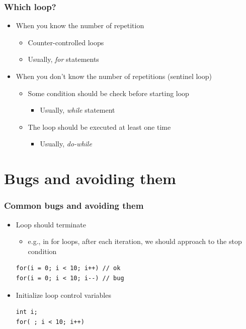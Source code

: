 \documentclass{../c-lecture}
\begin{document}
\begin{frame}
  \frametitle{Which loop?}
  \begin{itemize}
    \item When you know the number of repetition
    \begin{itemize}
      \item Counter-controlled loops
      \item Usually, \textit{\color{Orange} for} statements
    \end{itemize}
    \item When you don’t know the number of repetitions (sentinel loop)
    \begin{itemize}
      \item Some condition should be check before starting loop
      \begin{itemize}
        \item Usually, \textit{\color{LimeGreen} while} statement
      \end{itemize}
      \item The loop should be executed at least one time
      \begin{itemize}
        \item Usually, \textit{\color{Cyan} do-while}
      \end{itemize}
    \end{itemize}
  \end{itemize}
\end{frame}

\section{Bugs and avoiding them}

\begin{frame}[fragile]
  \frametitle{Common bugs and avoiding them}
  \begin{itemize}
    \item Loop should terminate
    \begin{itemize}
      \item
        e.g., in for loops, after each iteration, we should approach to the stop
        condition
    \end{itemize}
    \begin{verbatim}
for(i = 0; i < 10; i++) // ok
for(i = 0; i < 10; i--) // bug
    \end{verbatim}
    \item Initialize loop control variables
    \begin{verbatim}
int i;
for( ; i < 10; i++)
    \end{verbatim}
  \end{itemize}
\end{frame}
\end{document}

